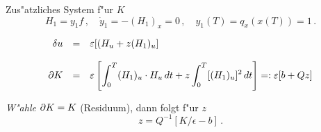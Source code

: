 \documentclass[12pt,a4paper,twoside]{article}
\begin{document}
Zus"atzliches System f"ur $K$
\[
H_1 = y_1f\,, \quad \dot{y}_1 = -(H_1)_x = 0\,,
\quad y_1(T) = q_x(x(T)) = 1\,.
\]

\[
\ba{.}{rcl}
\delta u &=& \dis \epsilon [(H_u + z (H_1)_u]\\[4mm]
\da K &=& \dis
\epsilon \left[\int_0^T (H_1)_u \cdot H_u\, dt
+ z \int_0^T [(H_1)_u]^2\, dt\right] =: \epsilon [b + Qz]
\ea{.}
\]

{\em W"ahle}  $\da K = K$ (Residuum), dann folgt f"ur $z$
\[
z = Q^{-1}[K/\epsilon  - b]\, .
\]

\end{document}
